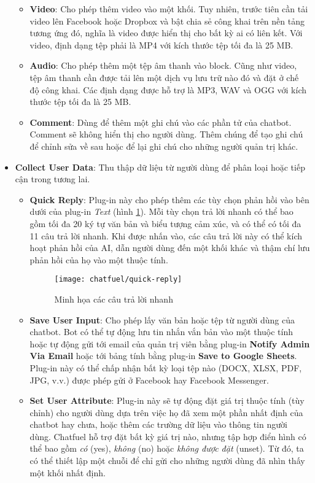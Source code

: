 \begin{itemize}
\begin{itemize}
\begin{figure}[htb!]
		\end{figure}
		\item \textbf{Video}: Cho phép thêm video vào một khối. Tuy nhiên, trước tiên cần tải video lên Facebook hoặc Dropbox và bật chia sẻ công khai trên nền tảng tương ứng đó, nghĩa là video được hiển thị cho bất kỳ ai có liên kết. Với video, định dạng tệp phải là MP4 với kích thước tệp tối đa là 25 MB.
		\item \textbf{Audio}: Cho phép thêm một tệp âm thanh vào block. Cũng như video, tệp âm thanh cần được tải lên một dịch vụ lưu trữ nào đó và đặt ở chế độ công khai. Các định dạng được hỗ trợ là MP3, WAV và OGG với kích thước tệp tối đa là 25 MB.
		\item \textbf{Comment}: Dùng để thêm một ghi chú vào các phần tử của chatbot. Comment sẽ không hiển thị cho người dùng. Thêm chúng để tạo ghi chú để chỉnh sửa về sau hoặc để lại ghi chú cho những người quản trị khác.
	\end{itemize}
	\item \textbf{Collect User Data}: Thu thập dữ liệu từ người dùng để phân loại hoặc tiếp cận trong tương lai. \begin{itemize}
		\item \textbf{Quick Reply}: Plug-in này cho phép thêm các tùy chọn phản hồi vào bên dưới của plug-in \textit{Text} (hình \ref{fig:fig-s3-9-chatfuel-quick-reply}). Mỗi tùy chọn trả lời nhanh có thể bao gồm tối đa 20 ký tự văn bản và biểu tượng cảm xúc, và có thể có tối đa 11 câu trả lời nhanh. Khi được nhấn vào, các câu trả lời này có thể kích hoạt phản hồi của AI, dẫn người dùng đến một khối khác và thậm chí lưu phản hồi của họ vào một thuộc tính.\par
		\begin{figure}[htb!]\centering
			\texttt{[image: chatfuel/quick-reply]}
			\caption{Minh họa các câu trả lời nhanh}
			\label{fig:fig-s3-9-chatfuel-quick-reply}
		\end{figure}
		\item \textbf{Save User Input}: Cho phép lấy văn bản hoặc tệp từ người dùng của chatbot. Bot có thể tự động lưu tin nhắn vắn bản vào một thuộc tính hoặc tự động gửi tới email của quản trị viên bằng plug-in \textbf{Notify Admin Via Email} hoặc tới bảng tính bằng plug-in \textbf{Save to Google Sheets}. Plug-in này có thể chấp nhận bất kỳ loại tệp nào (DOCX, XLSX, PDF, JPG, v.v.) được phép gửi ở Facebook hay Facebook Messenger.
		\item \textbf{Set User Attribute}: Plug-in này sẽ tự động đặt giá trị thuộc tính (tùy chỉnh) cho người dùng dựa trên việc họ đã xem một phần nhất định của chatbot hay chưa, hoặc thêm các trường dữ liệu vào thông tin người dùng. Chatfuel hỗ trợ đặt bất kỳ giá trị nào, nhưng tập hợp điển hình có thể bao gồm \textit{có} (yes), \textit{không} (no) hoặc \textit{không được đặt} (unset). Từ đó, ta có thể thiết lập một chuỗi để chỉ gửi cho những người dùng đã nhìn thấy một khối nhất định.

\end{itemize}
\end{itemize}
